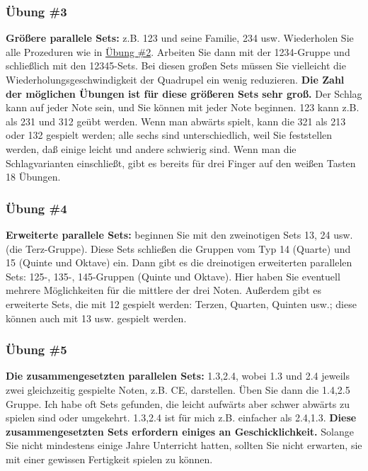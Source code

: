 \subsubsection{Übung \#3}\hypertarget{c1iii7b3}{}

\textbf{Größere parallele Sets:} z.B. 123 und seine Familie, 234 usw.
Wiederholen Sie alle Prozeduren wie in \hyperlink{c1iii7b2}{Übung \#2}.
Arbeiten Sie dann mit der 1234-Gruppe und schließlich mit den 12345-Sets.
Bei diesen großen Sets müssen Sie vielleicht die Wiederholungsgeschwindigkeit der Quadrupel ein wenig reduzieren.
\textbf{Die Zahl der möglichen Übungen ist für diese größeren Sets sehr groß.}
Der Schlag kann auf jeder Note sein, und Sie können mit jeder Note beginnen.
123 kann z.B. als 231 und 312 geübt werden.
Wenn man abwärts spielt, kann die 321 als 213 oder 132 gespielt werden; alle sechs sind unterschiedlich, weil Sie feststellen werden, daß einige leicht und andere schwierig sind.
Wenn man die Schlagvarianten einschließt, gibt es bereits für drei Finger auf den weißen Tasten 18 Übungen.


\subsubsection{Übung \#4}\hypertarget{c1iii7b4}{}

\textbf{Erweiterte parallele Sets:} beginnen Sie mit den zweinotigen Sets 13, 24 usw. (die Terz-Gruppe).
Diese Sets schließen die Gruppen vom Typ 14 (Quarte) und 15 (Quinte und Oktave) ein.
Dann gibt es die dreinotigen erweiterten parallelen Sets: 125-, 135-, 145-Gruppen (Quinte und Oktave).
Hier haben Sie eventuell mehrere Möglichkeiten für die mittlere der drei Noten.
Außerdem gibt es erweiterte Sets, die mit 12 gespielt werden: Terzen, Quarten, Quinten usw.; diese können auch mit 13 usw. gespielt werden.


\subsubsection{Übung \#5}\hypertarget{c1iii7b5}{}

\textbf{Die zusammengesetzten parallelen Sets:} 1.3,2.4, wobei 1.3 und 2.4 jeweils zwei gleichzeitig gespielte Noten, z.B. CE, darstellen.
Üben Sie dann die 1.4,2.5 Gruppe.
Ich habe oft Sets gefunden, die leicht aufwärts aber schwer abwärts zu spielen sind oder umgekehrt.
1.3,2.4 ist für mich z.B. einfacher als 2.4,1.3.
\textbf{Diese zusammengesetzten Sets erfordern einiges an Geschicklichkeit.}
Solange Sie nicht mindestens einige Jahre Unterricht hatten, sollten Sie nicht erwarten, sie mit einer gewissen Fertigkeit spielen zu können.

